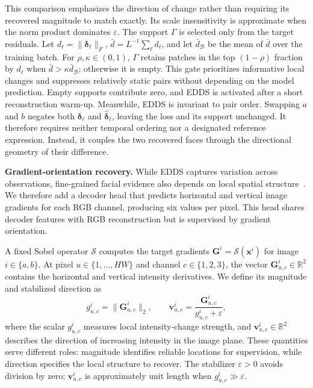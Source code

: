 \documentclass[10pt,journal,compsoc]{IEEEtran}
\begin{document}
This comparison emphasizes the direction of change rather than requiring its recovered magnitude to match exactly. Its scale insensitivity is approximate when the norm product dominates $\varepsilon$. The support $\Gamma$ is selected only from the target residuals. Let $d_{\ell}=\|\boldsymbol{\delta}_{\ell}\|_F$, $\bar d=L^{-1}\sum_{\ell}d_{\ell}$, and let $\bar d_{\mathcal{B}}$ be the mean of $\bar d$ over the training batch. For $\rho,\kappa\in(0,1)$, $\Gamma$ retains patches in the top $(1-\rho)$ fraction by $d_{\ell}$ when $\bar d>\kappa\bar d_{\mathcal{B}}$; otherwise it is empty. This gate prioritizes informative local changes and suppresses relatively static pairs without depending on the model prediction. Empty supports contribute zero, and EDDS is activated after a short reconstruction warm-up. Meanwhile, EDDS is invariant to pair order. Swapping $a$ and $b$ negates both $\boldsymbol{\delta}_{\ell}$ and $\hat{\boldsymbol{\delta}}_{\ell}$, leaving the loss and its support
unchanged. It therefore requires neither temporal ordering nor a designated reference expression. Instead, it couples the two recovered faces through the directional geometry of their difference.

\noindent\textbf{Gradient-orientation recovery.}
While EDDS captures variation across observations, fine-grained facial evidence also depends on local spatial structure~\cite{lee1996image}. We therefore add a decoder head that predicts horizontal and vertical image gradients for each RGB channel, producing six values per pixel. This head shares decoder features with RGB reconstruction but is supervised by gradient orientation.

A fixed Sobel operator $\mathcal{S}$ computes the target gradients $\mathbf{G}^{i}=\mathcal{S}(\mathbf{x}^{i})$ for image $i\in\{a,b\}$. At pixel $u\in\{1,\ldots,HW\}$ and channel $c\in\{1,2,3\}$, the vector $\mathbf{G}^{i}_{u,c}\in\mathbb{R}^{2}$ contains the horizontal and vertical intensity derivatives. We define its magnitude and stabilized direction as
\begin{equation}
g^{i}_{u,c}
=
\|\mathbf{G}^{i}_{u,c}\|_{2},
\qquad
\mathbf{v}^{i}_{u,c}
=
\frac{\mathbf{G}^{i}_{u,c}}
{g^{i}_{u,c}+\varepsilon},
\label{eq:dime_gradient_orientation}
\end{equation}
where the scalar $g^{i}_{u,c}$ measures local intensity-change strength, and $\mathbf{v}^{i}_{u,c}\in\mathbb{R}^{2}$ describes the direction of increasing intensity in the image plane. These quantities serve different roles: magnitude identifies reliable locations for supervision, while direction specifies the local structure to recover. The stabilizer $\varepsilon>0$ avoids division by zero; $\mathbf{v}^{i}_{u,c}$ is approximately unit length when $g^{i}_{u,c}\gg\varepsilon$.
\end{document}
